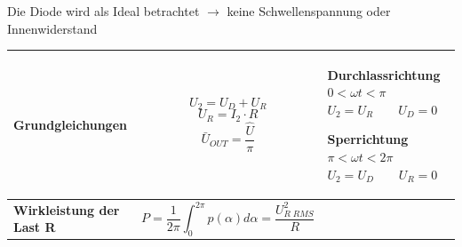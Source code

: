 \newline

Die Diode wird als Ideal betrachtet $ \rightarrow $ keine Schwellenspannung oder Innenwiderstand
\begin{longtable}{| p{} | p{} | p{} |} %
    \hline
    \textbf{Grundgleichungen}&
    \[ U_2 = U_D + U_R \]
    \[ U_R = I_2 \cdot R\]
    \[ \bar{U}_{OUT} = \dfrac{\hat{U}}{\pi}\]&
    \textbf{Durchlassrichtung}\newline
    $ 0 < \omega t < \pi $\newline
    $U_2 = U_R \qquad U_D = 0$\newline

    \textbf{Sperrichtung}\newline
    $ \pi < \omega t < 2\pi $\newline
    $ U_2=U_D \qquad U_R = 0 $\newline
    \\
    \hline
    
    \textbf{Wirkleistung der Last R}&
    \[ P=\frac{1}{2\pi} \int_{0}^{2\pi} p(\alpha) d\alpha = \dfrac{U_{R\;RMS}^2}{R} \]&
    \\ \hline
\end{longtable}

